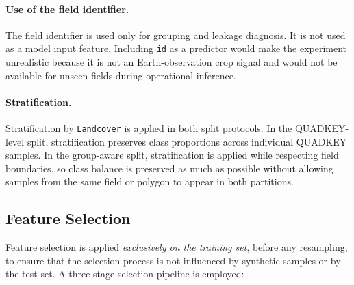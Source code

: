 \paragraph{Use of the field identifier.}
The field identifier is used only for grouping and leakage diagnosis. It is
not used as a model input feature. Including \texttt{id} as a predictor would
make the experiment unrealistic because it is not an Earth-observation crop
signal and would not be available for unseen fields during operational
inference.

\paragraph{Stratification.}
Stratification by \texttt{Landcover} is applied in both split protocols. In
the QUADKEY-level split, stratification preserves class proportions across
individual QUADKEY samples. In the group-aware split, stratification is
applied while respecting field boundaries, so class balance is preserved as
much as possible without allowing samples from the same field or polygon to
appear in both partitions.


\subsection{Feature Selection}
\label{subsec:feat_sel}

Feature selection is applied \emph{exclusively on the training set},
before any resampling, to ensure that the selection process is not
influenced by synthetic samples or by the test set. A three-stage
selection pipeline is employed:

